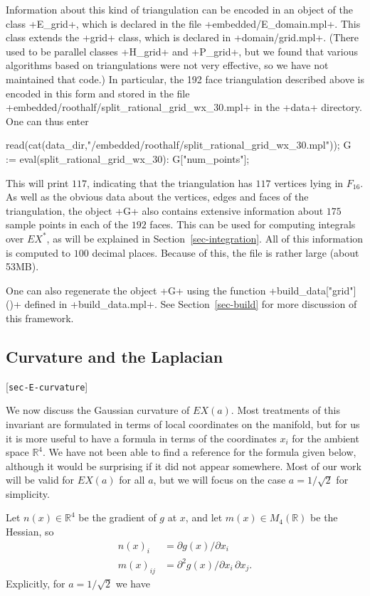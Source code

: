 \documentclass[reqno]{amsart}
\newcommand{\lbl}[1]{\label{#1}\textup{[\texttt{#1}]}\par}
\newcommand{\lbl}{\label}
\newcommand{\R}         {{\mathbb{R}}}
\newcommand{\rt}        {\sqrt{2}}
\renewcommand{\:}{\colon}
\theoremstyle{definition}
\begin{document}
Information about this kind of triangulation can be encoded in an
object of the class \mcode+E_grid+, which is declared in the file
\fname+embedded/E_domain.mpl+.  This class extends the \mcode+grid+
class, which is declared in \fname+domain/grid.mpl+.  (There used to
be parallel classes \mcode+H_grid+ and \mcode+P_grid+, but we found that
various algorithms based on triangulations were not very effective, so
we have not maintained that code.)  In particular, the 192 face
triangulation described above is encoded in this form and stored in
the file
\fname+embedded/roothalf/split_rational_grid_wx_30.mpl+ in the
\mcode+data+ directory.  One can
thus enter
\begin{mcodeblock}
   read(cat(data_dir,"/embedded/roothalf/split_rational_grid_wx_30.mpl"));
   G := eval(split_rational_grid_wx_30):
   G["num_points"];
\end{mcodeblock}
This will print $117$, indicating that the triangulation has $117$
vertices lying in $F_{16}$.  As well as the obvious data about the
vertices, edges and faces of the triangulation, the object \mcode+G+
also contains extensive information about $175$ sample points in each of
the $192$ faces.  This can be used for computing integrals over
$EX^*$, as will be explained in Section~\ref{sec-integration}.  All of
this information is computed to $100$ decimal places.  Because of
this, the file is rather large (about 53MB).

One can also regenerate the object \mcode+G+ using the function
\mcode+build_data["grid"]()+ defined in \fname+build_data.mpl+.  See
Section~\ref{sec-build} for more discussion of this framework. 

\subsection{Curvature and the Laplacian}
\lbl{sec-E-curvature}

We now discuss the Gaussian curvature of $EX(a)$.  Most treatments of
this invariant are formulated in terms of local coordinates on the
manifold, but for us it is more useful to have a formula in terms of
the coordinates $x_i$ for the ambient space $\R^4$.  We have not been
able to find a reference for the formula given below, although it
would be surprising if it did not appear somewhere.  Most of our work
will be valid for $EX(a)$ for all $a$, but we will focus on the case
$a=1/\rt$ for simplicity.

Let $n(x)\in\R^4$ be the gradient of $g$ at $x$, and let
$m(x)\in M_4(\R)$ be the Hessian, so
\begin{align*}
 n(x)_i &= \partial g(x)/\partial x_i \\
 m(x)_{ij} &= \partial^2 g(x)/\partial x_i\,\partial x_j.
\end{align*}
Explicitly, for $a=1/\rt$ we have
\end{document}
